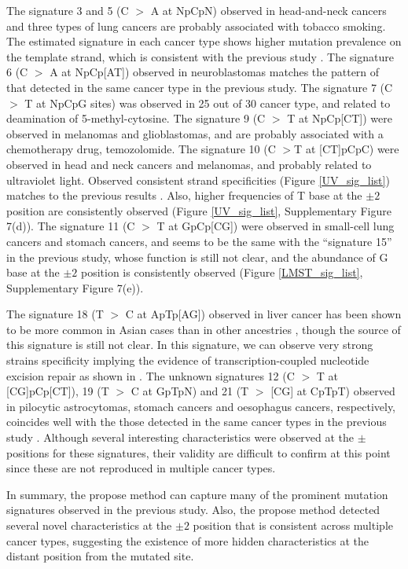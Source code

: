 The signature 3 and 5 (C $>$ A at NpCpN) observed in head-and-neck cancers and three types of lung cancers are probably associated with tobacco smoking.
The estimated signature in each cancer type shows higher mutation prevalence on the template strand, which is consistent with the previous study \cite{pmid12379884, pmid23318258}.
The signature 6 (C $>$ A at NpCp[AT]) observed in neuroblastomas matches the pattern of that detected in the same cancer type in the previous study.
The signature 7 (C $>$ T at NpCpG sites) was observed in 25 out of 30 cancer type, and related to deamination of 5-methyl-cytosine.
The signature 9 (C $>$ T at NpCp[CT]) were observed in melanomas and glioblastomas, and are probably associated with a chemotherapy drug, temozolomide.
The signature 10 (C $>$T at [CT]pCpC) were observed in head and neck cancers and melanomas, and probably related to ultraviolet light.
Observed consistent strand specificities (Figure \ref{UV_sig_list}) matches to the previous results \cite{pmid23318258}.   
Also, higher frequencies of T base at the $\pm 2$ position are consistently observed (Figure \ref{UV_sig_list}, Supplementary Figure 7(d)).
The signature 11 (C $>$ T at GpCp[CG]) were observed in small-cell lung cancers and stomach cancers,
and seems to be the same with the ``signature 15'' in the previous study, whose function is still not clear,
and the abundance of G base at the $\pm 2$ position is consistently observed (Figure \ref{LMST_sig_list}, Supplementary Figure 7(e)).


The signature 18 (T $>$ C at ApTp[AG]) observed in liver cancer has been shown to be more common in Asian cases than in other ancestries \cite{pmid25362482}, 
though the source of this signature is still not clear. 
In this signature, we can observe very strong strains specificity implying the evidence of transcription-coupled nucleotide excision repair as shown in \cite{pmid25362482, pmid23318258}.
The unknown signatures 12 (C $>$ T at [CG]pCp[CT]), 19 (T $>$ C at GpTpN) and 21 (T $>$ [CG] at CpTpT) observed in pilocytic astrocytomas, stomach cancers and oesophagus cancers, respectively,
coincides well with the those detected in the same cancer types in the previous study \cite{pmid23318258}.
Although several interesting characteristics were observed at the $\pm$ positions for these signatures, 
their validity are difficult to confirm at this point since these are not reproduced in multiple cancer types.


In summary, the propose method can capture many of the prominent mutation signatures observed in the previous study.
Also, the propose method detected several novel characteristics at the $\pm 2$ position that is consistent across multiple cancer types,
suggesting the existence of more hidden characteristics at the distant position from the mutated site.


